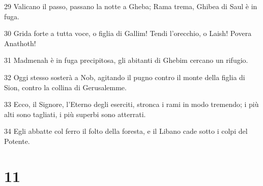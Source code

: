 \par 29 Valicano il passo, passano la notte a Gheba; Rama trema, Ghibea di Saul è in fuga.
\par 30 Grida forte a tutta voce, o figlia di Gallim! Tendi l'orecchio, o Laish! Povera Anathoth!
\par 31 Madmenah è in fuga precipitosa, gli abitanti di Ghebim cercano un rifugio.
\par 32 Oggi stesso sosterà a Nob, agitando il pugno contro il monte della figlia di Sion, contro la collina di Gerusalemme.
\par 33 Ecco, il Signore, l'Eterno degli eserciti, stronca i rami in modo tremendo; i più alti sono tagliati, i più superbi sono atterrati.
\par 34 Egli abbatte col ferro il folto della foresta, e il Libano cade sotto i colpi del Potente.

\chapter{11}

